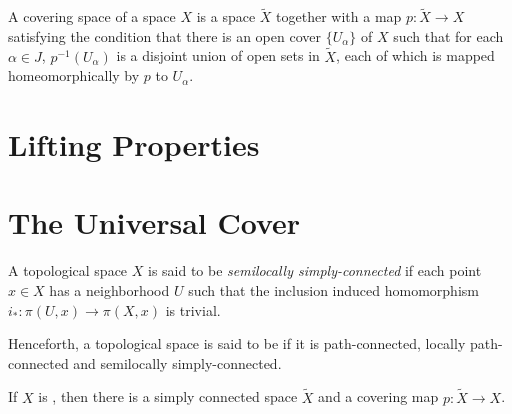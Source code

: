 \begin{definition}
    A covering space of a space $X$ is a space $\widetilde X$ together with a map $p:\widetilde X\to X$ satisfying the condition that there is an open cover $\{U_\alpha\}$ of $X$ such that for each $\alpha\in J$, $p^{-1}(U_\alpha)$ is a disjoint union of open sets in $\widetilde X$, each of which is mapped homeomorphically by $p$ to $U_\alpha$.
\end{definition}

\section{Lifting Properties}

\section{The Universal Cover}

\begin{definition}
    A topological space $X$ is said to be \textit{semilocally simply-connected} if each point $x\in X$ has a neighborhood $U$ such that the inclusion induced homomorphism $i_*:\pi(U, x)\to\pi(X,x)$ is trivial.
\end{definition}

Henceforth, a topological space is said to be \nice if it is path-connected, locally path-connected and semilocally simply-connected.

\begin{theorem}
    If $X$ is \nice, then there is a simply connected space $\widetilde X$ and a covering map $p:\widetilde X\to X$.
\end{theorem}